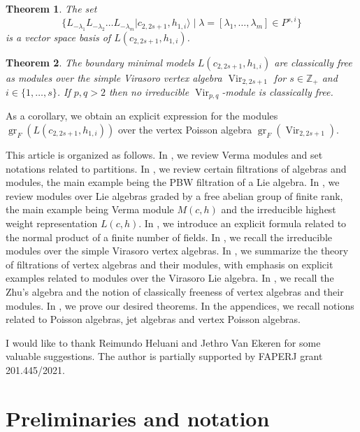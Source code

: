 \documentclass[a4paper, 12pt, reqno]{amsart}
\newtheorem{theorem}{Theorem}[section]
\theoremstyle{remark}
\DeclareMathOperator{\Vir}{Vir}
\DeclareMathOperator{\gr}{gr}
\begin{document}
\begin{theorem}
  \label{thr:2}
  The set
  \begin{equation*}
    \{L_{-\lambda_1}L_{-\lambda_2}\dots L_{-\lambda_m}|c_{2, 2s + 1}, h_{1, i}\rangle \mid \lambda = [\lambda_1, \dots, \lambda_m] \in P^{s, i}\}
  \end{equation*}
  is a vector space basis of $L(c_{2, 2s + 1}, h_{1, i})$.
\end{theorem}

\begin{theorem}
  \label{thr:3}
  The boundary minimal models $L(c_{2, 2s + 1}, h_{1, i})$ are classically free as modules over the simple Virasoro vertex algebra $\Vir_{2, 2s + 1}$ for $s \in \mathbb{Z}_+$ and $i \in \{1, \dots, s\}$. If $p, q > 2$ then no irreducible $\Vir_{p, q}$-module is classically free.
\end{theorem}
As a corollary, we obtain an explicit expression for the modules $\gr_F(L(c_{2, 2s + 1}, h_{1, i}))$ over the vertex Poisson algebra $\gr_F(\Vir_{2, 2s + 1})$.

This article is organized as follows.
In , we review Verma modules and set notations related to partitions.
In , we review certain filtrations of algebras and modules, the main example being the PBW filtration of a Lie algebra.
In , we review modules over Lie algebras graded by a free abelian group of finite rank, the main example being Verma module $M(c, h)$ and the irreducible highest weight representation $L(c, h)$.
In , we introduce an explicit formula related to the normal product of a finite number of fields.
In , we recall the irreducible modules over the simple Virasoro vertex algebras.
In , we summarize the theory of filtrations of vertex algebras and their modules, with emphasis on explicit examples related to modules over the Virasoro Lie algebra.
In , we recall the Zhu's algebra and the notion of classically freeness of vertex algebras and their modules.
In , we prove our desired theorems.
In the appendices, we recall notions related to Poisson algebras, jet algebras and vertex Poisson algebras.

I would like to thank Reimundo Heluani and Jethro Van Ekeren for some valuable suggestions.
The author is partially supported by FAPERJ grant 201.445/2021.

\section{Preliminaries and notation}
\label{sec:prel-notat}
\end{document}
